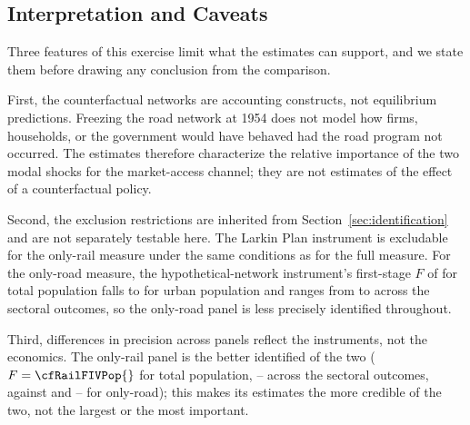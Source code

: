 

\subsection{Interpretation and Caveats}
\label{sec:cf_caveats}

Three features of this exercise limit what the estimates can support,
and we state them before drawing any conclusion from the comparison.

First, the counterfactual networks are accounting constructs, not
equilibrium predictions. Freezing the road network at 1954 does not
model how firms, households, or the government would have behaved had
the road program not occurred. The estimates therefore characterize
the relative importance of the two modal shocks for the market-access
channel; they are not estimates of the effect of a counterfactual
policy.

Second, the exclusion restrictions are inherited from
Section~\ref{sec:identification} and are not separately testable here. The
Larkin Plan instrument is excludable for the only-rail measure under
the same conditions as for the full measure. For the only-road
measure, the hypothetical-network instrument's first-stage $F$ of \cfRoadFIVPop{}
for total population falls to \cfRoadFUrb{} for urban population and
ranges from \cfRoadFSectMin{} to \cfRoadFSectMax{} across the sectoral
outcomes, so the only-road panel is less precisely identified
throughout.

Third, differences in precision across panels reflect the instruments,
not the economics. The only-rail panel is the better identified of the
two ($F = \cfRailFIVPop{}$ for total population,
\cfRailFSectMin{}--\cfRailFSectMax{} across the sectoral outcomes,
against \cfRoadFIVPop{} and
\cfRoadFSectMin{}--\cfRoadFSectMax{} for only-road);
this makes its estimates the more credible of the two, not the largest
or the most important.

